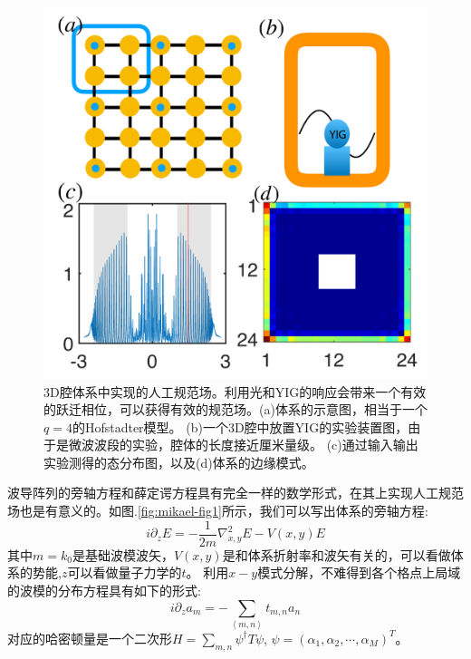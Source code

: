 \documentclass[supercite]{HustGraduPaper}
\newcommand{\avg}[1]{\left\langle #1 \right\rangle}
\begin{document}

\begin{figure}
	\centering
	\includegraphics[width=0.9\linewidth]{Figures/topphoto/MicrowaveLatticePicNEW}
	\caption{3D腔体系中实现的人工规范场。利用光和YIG的响应会带来一个有效的跃迁相位，可以获得有效的规范场。\cite{owens2018quarter}(a)体系的示意图，相当于一个$q = 4$的Hofstadter模型。 (b)一个3D腔中放置YIG的实验装置图，由于是微波波段的实验，腔体的长度接近厘米量级。 (c)通过输入输出实验测得的态分布图，以及(d)体系的边缘模式。}
	\label{fig:microwavelatticepic}
\end{figure}


波导阵列的旁轴方程和薛定谔方程具有完全一样的数学形式，在其上实现人工规范场也是有意义的。如图.\ref{fig:mikael-fig1}所示，我们可以写出体系的旁轴方程\cite{rechtsman2013strain,rechtsman2013photonic,rechtsman2013topological}:
\begin{equation}
	i \partial_z E = - \frac{1}{2m} \nabla^2_{x,y} E - V(x,y) E
\end{equation}
其中$m = k_0 $是基础波模波矢，$V(x,y)$是和体系折射率和波矢有关的，可以看做体系的势能,$z$可以看做量子力学的$t$。 利用$x-y$模式分解，不难得到各个格点上局域的波模的分布方程具有如下的形式\cite{rechtsman2013strain,rechtsman2013photonic,rechtsman2013topological}:
\begin{equation}
i \partial_z a_m = - \sum_{\avg{m,n}} t_{m,n} a_n
\end{equation}
对应的哈密顿量是一个二次形$H = \sum_{m,n} \psi^\dagger T \psi$, $\psi = (\alpha_1, \alpha_2,\cdots, \alpha_M)^T$。
\end{document}
